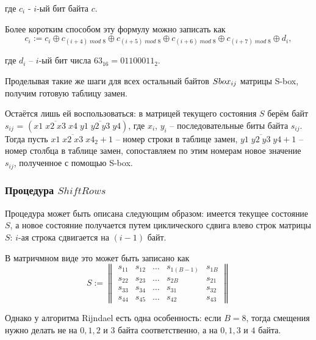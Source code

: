     где $c_{i}$ - $i$-ый бит байта $c$.

    Более коротким способом эту формулу можно записать как
    \begin{equation}
        c_{i} := c_{i} \oplus c_{(i + 4) \; mod \; 8} \oplus c_{(i + 5) \; mod \; 8} \oplus c_{(i + 6) \; mod \; 8}
        \oplus c_{(i + 7) \; mod \; 8} \oplus d_{i},
    \end{equation}

    где $d_{i}$ -- $i$-ый бит числа $63_{16} = 01100011_{2}$.

    Проделывая такие же шаги для всех остальный байтов $S\-box_{ij}$ матрицы S-box, получим готовую таблицу замен.

    Остаётся лишь ей воспользоваться: в матрицей текущего состояния $S$ берём байт
    $s_{ij}$ = $(\overline{x1 \; x2 \; x3 \; x4} \; \overline{y1 \; y2 \; y3 \; y4})$, где $x_{i}$, $y_{i}$ -- последовательные
    биты байта $s_{ij}$. Тогда пусть $\overline{x1 \; x2 \; x3 \; x4}_2 + 1$ -- номер строки в таблице замен,
    $\overline{y1 \; y2 \; y3 \; y4} + 1$ -- номер столбца в таблице замен, сопоставляем по этим номерам новое значение
    $s_{ij}$, полученное с помощью S-box.

\subsubsection{Процедура $ShiftRows$} \label{ShiftRows}

    Процедура может быть описана следующим образом: имеется текущее состояние $S$, а новое состояние
    получается путем циклического сдвига влево строк матрицы $S$: $i$-ая строка сдвигается на $(i - 1)$
    байт.

    В матричмном виде это может быть записано как
    \begin{equation}
        S :=
        \begin{Vmatrix}
            s_{11} & s_{12} & \dots & s_{1(B - 1)} & s_{1B} \\
            s_{22} & s_{23} & \dots & s_{2B} & s_{21} \\
            s_{33} & s_{34} & \dots & s_{31} & s_{32} \\
            s_{44} & s_{45} & \dots & s_{42} & s_{43}
        \end{Vmatrix}
    \end{equation}

    Однако у алгоритма Rijndael есть одна особенность: если $B = 8$, тогда смещения нужно делать не на
    $0, 1, 2$ и $3$ байта соответственно, а на $0, 1, 3$ и $4$ байта.

